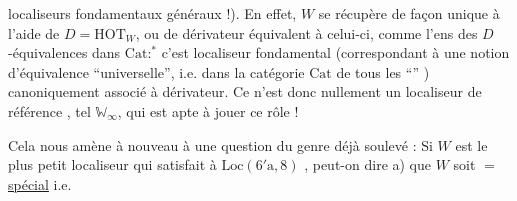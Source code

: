 localiseurs fondamentaux généraux !). En
effet, $W$ se récupère de façon unique
à l'aide de $D=\mathrm{HOT}_{W}$, ou de 
dérivateur équivalent à celui-ci,
comme l'ens des $D$-équivalences dans
$\mathrm{Cat}$:$^{\ast}$ c'est  localiseur fondamental
(correspondant à une notion d'équivalence
``universelle'', i.e. dans la catégorie $\mathrm{Cat}$
de tous les ``'' )
canoniquement associé à  dérivateur.
Ce n'est donc nullement un localiseur
de référence , tel $\mathbb{W}_{\infty}$,
qui est apte à jouer ce rôle !

Cela nous amène à nouveau à une
question du genre déjà soulevé : Si
$W$  est le plus petit localiseur qui
satisfait à $\mathrm{Loc}(6'\mathrm{a},8)$ , peut-on
dire a) que $W$ soit $=$ \uline{spécial} i.e.
